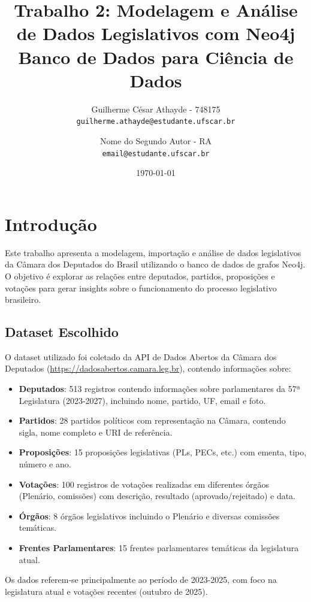 \documentclass[12pt,a4paper]{article}
\title{
    \textbf{Trabalho 2: Modelagem e Análise de Dados Legislativos com Neo4j}\\
    \large Banco de Dados para Ciência de Dados
}
\author{
    Guilherme César Athayde - 748175 \\
    \texttt{guilherme.athayde@estudante.ufscar.br}
    \and
    Nome do Segundo Autor - RA \\
    \texttt{email@estudante.ufscar.br}
}
\date{\today}
\begin{document}
\maketitle
\thispagestyle{empty}

\newpage
\tableofcontents
\newpage

\section{Introdução}

Este trabalho apresenta a modelagem, importação e análise de dados legislativos da Câmara dos Deputados do Brasil utilizando o banco de dados de grafos Neo4j. O objetivo é explorar as relações entre deputados, partidos, proposições e votações para gerar insights sobre o funcionamento do processo legislativo brasileiro.

\subsection{Dataset Escolhido}

O dataset utilizado foi coletado da API de Dados Abertos da Câmara dos Deputados (\url{https://dadosabertos.camara.leg.br}), contendo informações sobre:

\begin{itemize}
    \item \textbf{Deputados}: 513 registros contendo informações sobre parlamentares da 57ª Legislatura (2023-2027), incluindo nome, partido, UF, email e foto.
    \item \textbf{Partidos}: 28 partidos políticos com representação na Câmara, contendo sigla, nome completo e URI de referência.
    \item \textbf{Proposições}: 15 proposições legislativas (PLs, PECs, etc.) com ementa, tipo, número e ano.
    \item \textbf{Votações}: 100 registros de votações realizadas em diferentes órgãos (Plenário, comissões) com descrição, resultado (aprovado/rejeitado) e data.
    \item \textbf{Órgãos}: 8 órgãos legislativos incluindo o Plenário e diversas comissões temáticas.
    \item \textbf{Frentes Parlamentares}: 15 frentes parlamentares temáticas da legislatura atual.
\end{itemize}

Os dados referem-se principalmente ao período de 2023-2025, com foco na legislatura atual e votações recentes (outubro de 2025).
\end{document}
